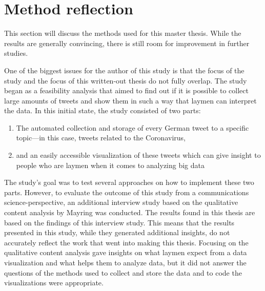 \section{Method reflection}
This section will discuss the methods used for this master thesis. While the results are generally convincing, there is still room for improvement in further studies.

One of the biggest issues for the author of this study is that the focus of the study and the focus of this written-out thesis do not fully overlap. The study began as a feasibility analysis that aimed to find out if it is possible to collect large amounts of tweets and show them in such a way that laymen can interpret the data. In this initial state, the study consisted of two parts:

\begin{enumerate}
    \item The automated collection and storage of every German tweet to a specific topic---in this case, tweets related to the Coronavirus,
    \item and an easily accessible visualization of these tweets which can give insight to people who are laymen when it comes to analyzing big data
\end{enumerate}

The study's goal was to test several approaches on how to implement these two parts. However, to evaluate the outcome of this study from a communications science-perspective, an additional interview study based on the qualitative content analysis by Mayring was conducted. The results found in this thesis are based on the findings of this interview study. This means that the results presented in this study, while they generated additional insights, do not accurately reflect the work that went into making this thesis. Focusing on the qualitative content analysis gave insights on what laymen expect from a data visualization and what helps them to analyze data, but it did not answer the questions of the methods used to collect and store the data and to code the visualizations were appropriate.


